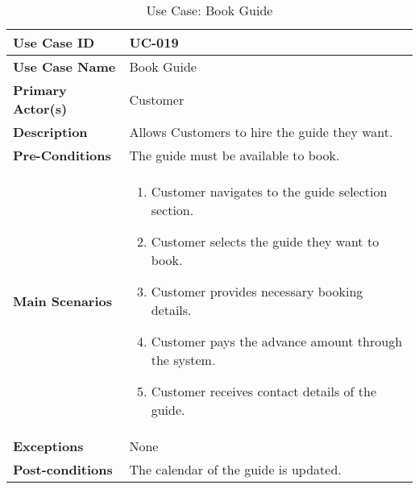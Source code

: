 \begin{table}[ht]
    \centering
    \begin{tabular}{|l|p{}|}
        \hline
        \textbf{Use Case ID} & UC-019 \\
        \hline
        \textbf{Use Case Name} & Book Guide \\
        \hline
        \textbf{Primary Actor(s)} & Customer \\
        \hline
        \textbf{Description} & Allows Customers to hire the guide they want. \\
        \hline
        \textbf{Pre-Conditions} & The guide must be available to book. \\
        \hline
        \textbf{Main Scenarios} & 
        \begin{enumerate}[label=\arabic*.,itemsep=0pt]
            \item Customer navigates to the guide selection section.
            \item Customer selects the guide they want to book.
            \item Customer provides necessary booking details.
            \item Customer pays the advance amount through the system.
            \item Customer receives contact details of the guide.
        \end{enumerate} \\
        \hline
        \textbf{Exceptions} & None \\
        \hline
        \textbf{Post-conditions} & The calendar of the guide is updated. \\
        \hline
    \end{tabular}
    \label{tab:use-case-book-guide}
    \caption{Use Case: Book Guide}
\end{table}


